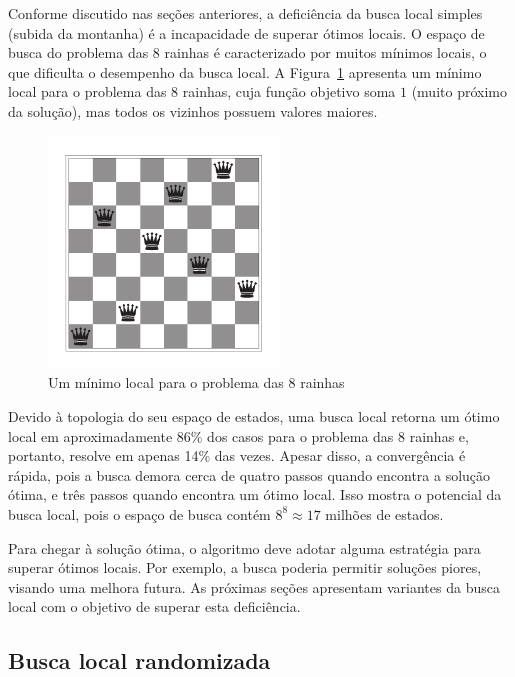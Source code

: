 Conforme discutido nas seções anteriores, a deficiência da busca local simples (subida da montanha) é a incapacidade de superar ótimos locais. O espaço de busca do problema das 8 rainhas é caracterizado por muitos mínimos locais, o que dificulta o desempenho da busca local. A Figura~\ref{fig:minimo-local-oito-rainhas} apresenta um mínimo local para o problema das 8 rainhas, cuja função objetivo soma $1$ (muito próximo da solução), mas todos os vizinhos possuem valores maiores.

\begin{figure}[h]
	\centering
	\includegraphics[width=0.55\textwidth]{img/minimo-local-oito-rainhas}
	\caption{Um mínimo local para o problema das 8 rainhas}
	\label{fig:minimo-local-oito-rainhas}
\end{figure}

Devido à topologia do seu espaço de estados, uma busca local retorna um ótimo local em aproximadamente 86\% dos casos para o problema das 8 rainhas e, portanto, resolve em apenas 14\% das vezes. Apesar disso, a convergência é rápida, pois a busca demora cerca de quatro passos quando encontra a solução ótima, e três passos quando encontra um ótimo local. Isso mostra o potencial da busca local, pois o espaço de busca contém $8^8 \approx 17$ milhões de estados.

Para chegar à solução ótima, o algoritmo deve adotar alguma estratégia para superar ótimos locais. Por exemplo, a busca poderia permitir soluções piores, visando uma melhora futura. As próximas seções apresentam variantes da busca local com o objetivo de superar esta deficiência.

\subsection{Busca local randomizada}

